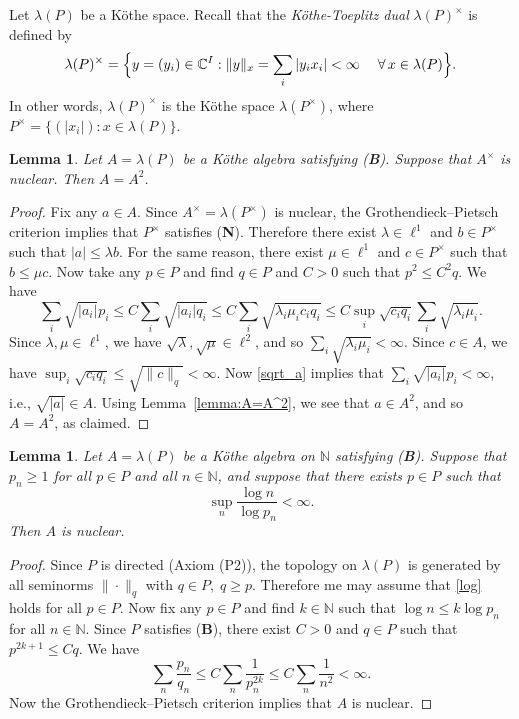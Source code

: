 \documentclass[12pt,reqno]{amsart}
\newtheorem{lemma}[theorem]{Lemma}
\theoremstyle{definition}
\begin{document}
Let $\lambda(P)$ be a K\"othe space. Recall that
the {\em K\"othe-Toeplitz dual} $\lambda(P)^\times$ is defined by
\[
\lambda(P)^\times=
\Bigl\{ y=(y_i)\in{\mathbb C}^I :
\| y\|_x=\sum_i |y_i x_i| <\infty\quad\;\forall\, x\in\lambda(P)\Bigr\}.
\]
In other words, $\lambda(P)^\times$ is the K\"othe space $\lambda(P^\times)$,
where $P^\times=\{ (|x_i|): x\in\lambda(P)\}$.

\begin{lemma}
\label{lemma:nucl_idemp}
Let $A=\lambda(P)$ be a K\"othe algebra satisfying {\upshape ({\textbf{B}})}.
Suppose that $A^\times$ is nuclear. Then $A=A^2$.
\end{lemma}
\begin{proof}
Fix any $a\in A$.
Since $A^\times=\lambda(P^\times)$ is nuclear, the Grothendieck--Pietsch
criterion implies that $P^\times$ satisfies ({\textbf{N}}).
Therefore there exist $\lambda\in\ell^1$ and $b\in P^\times$ such that $|a|\le\lambda b$.
For the same reason, there exist $\mu\in\ell^1$ and $c\in P^\times$ such that $b\le\mu c$.
Now take any $p\in P$ and find $q\in P$ and $C>0$ such that $p^2\le C^2q$.
We have
\begin{equation}
\label{sqrt_a}
\sum_i \sqrt{|a_i|} p_i
\le C\sum_i\sqrt{|a_i|q_i}
\le C\sum_i\sqrt{\lambda_i\mu_i c_i q_i}
\le C\sup_i\sqrt{ c_i q_i} \sum_i\sqrt{\lambda_i\mu_i}.
\end{equation}
Since $\lambda,\mu\in\ell^1$, we have $\sqrt{\lambda},\sqrt{\mu}\in\ell^2$,
and so $\sum_i\sqrt{\lambda_i\mu_i}<\infty$. Since $c\in A$, we have
$\sup_i\sqrt{c_i q_i}\le\sqrt{\| c\|_q}<\infty$.
Now \eqref{sqrt_a} implies that $\sum_i \sqrt{|a_i|} p_i<\infty$, i.e., $\sqrt{|a|}\in A$.
Using Lemma~\ref{lemma:A=A^2}, we see that $a\in A^2$, and so $A=A^2$, as claimed.
\end{proof}

\begin{lemma}
\label{lemma:log_nucl}
Let $A=\lambda(P)$ be a K\"othe algebra on ${\mathbb N}$ satisfying {\upshape ({\textbf{B}})}.
Suppose that $p_n\ge 1$ for all
$p\in P$ and all $n\in{\mathbb N}$, and suppose that there exists $p\in P$ such that
\begin{equation}
\label{log}
\sup_n \frac{\log n}{\log p_n}<\infty.
\end{equation}
Then $A$ is nuclear.
\end{lemma}
\begin{proof}
Since $P$ is directed (Axiom (P2)), the topology on $\lambda(P)$ is generated by all
seminorms $\|\cdot\|_q$ with $q\in P,\; q\ge p$. Therefore me may assume that
\eqref{log} holds for all $p\in P$.
Now fix any $p\in P$ and find $k\in{\mathbb N}$ such that $\log n\le k\log p_n$ for all $n\in{\mathbb N}$.
Since $P$ satisfies ({\textbf{B}}), there exist $C>0$ and $q\in P$ such that
$p^{2k+1}\le Cq$. We have
\[
\sum_n \frac{p_n}{q_n}
\le C\sum_n \frac{1}{p_n^{2k}}
\le C\sum_n \frac{1}{n^2}<\infty.
\]
Now the Grothendieck--Pietsch criterion implies that $A$ is nuclear.
\end{proof}
\end{document}
